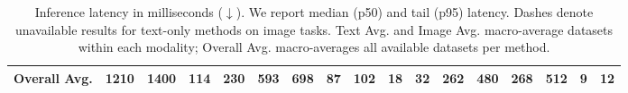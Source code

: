 \begin{table}[t]
{\begin{tabular}{l cc cc cc cc cc | cc cc cc}
Overall Avg.
& 1210 & 1400
& 114 & 230
& 593 & 698
& 87 & 102
& 18 & 32
& 262 & 480
& 268 & 512
& 9 & 12 \\

\bottomrule
\end{tabular}
}
\caption{Inference latency in milliseconds ($\downarrow$).
We report median (p50) and tail (p95) latency.
Dashes denote unavailable results for text-only methods on image tasks.
Text Avg. and Image Avg. macro-average datasets within each modality; Overall Avg. macro-averages all available datasets per method.}
\label{tab:runtime}
\end{table}